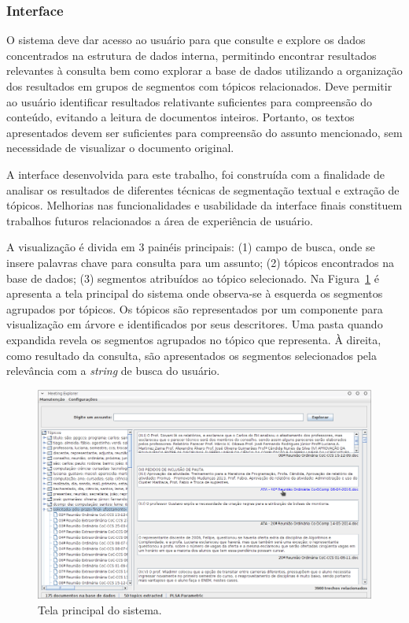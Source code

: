 \subsubsection{Interface}

O sistema deve dar acesso ao usuário para que consulte e explore os dados concentrados na estrutura de dados interna, permitindo encontrar resultados relevantes à consulta bem como explorar a base de dados utilizando a organização dos resultados em grupos de segmentos com tópicos relacionados. Deve permitir ao usuário identificar resultados relativante suficientes para compreensão do conteúdo, evitando a leitura de documentos inteiros. Portanto, os textos apresentados devem ser suficientes para compreensão do assunto mencionado, sem necessidade de visualizar o documento original.

A interface desenvolvida para este trabalho, foi construída com a finalidade de analisar os resultados de diferentes técnicas de segmentação textual e extração de tópicos. Melhorias nas funcionalidades e usabilidade da interface finais constituem trabalhos futuros relacionados a área de experiência de usuário.

A visualização é divida em 3 painéis principais: (1) campo de busca, onde se insere palavras chave para consulta para um assunto; (2) tópicos encontrados na base de dados; (3) segmentos atribuídos ao tópico selecionado. 
Na Figura~\ref{fig:tela-principal} é apresenta a tela principal do sistema onde observa-se à esquerda os segmentos agrupados por tópicos. Os tópicos são representados por um componente para visualização em árvore e identificados por seus descritores. 
Uma pasta quando expandida revela os segmentos agrupados no tópico que representa. À direita, como resultado da consulta, são apresentados os segmentos selecionados pela relevância com a \textit{string} de busca do usuário. 

  \begin{figure}[!h]
	  \centering
	  \includegraphics[width=\textwidth]{conteudo/capitulos/figs/tela-principal-2-1.png}
	  \caption{Tela principal do sistema.}
	  \label{fig:tela-principal}
  \end{figure}




